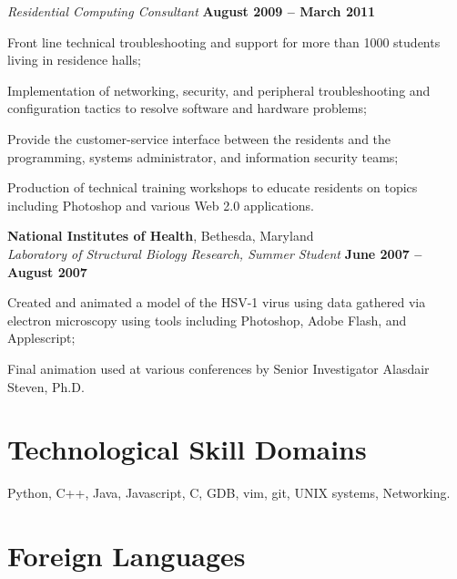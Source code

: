 \documentclass[margin,line]{resume}
\begin{document}
\begin{resume}
\begin{list2}
	\textsl{Residential Computing Consultant} \hfill \textbf{August 2009 -- March 2011}
	\begin{list2}
		\item Front line technical troubleshooting and support for more than 1000 students living in residence halls;
		\item Implementation of networking, security, and peripheral troubleshooting and configuration tactics to resolve software and hardware problems;
		\item Provide the customer-service interface between the residents and the programming, systems administrator, and information security teams;
		\item Production of technical training workshops to educate residents on topics including Photoshop and various Web 2.0 
	applications. 
	\end{list2}\vspace{-1.5mm}

	\textbf{National Institutes of Health}, Bethesda, Maryland \vspace{1mm}\\\vspace{0mm}%
	\textsl{Laboratory of Structural Biology Research, Summer Student} \hfill \textbf{June 2007 -- August 2007}
	\begin{list2}
		\item Created and animated a model of the HSV-1 virus using data gathered via electron microscopy 
	using tools including Photoshop, Adobe Flash, and Applescript;
		\item Final animation used at various conferences by Senior Investigator Alasdair Steven, Ph.D.
	\end{list2}\vspace{-1.5mm}

	\section{\mysidestyle Technological Skill Domains} 

	Python, C++, Java, Javascript, C, GDB, vim, git, UNIX systems, Networking.


	\section{\mysidestyle Foreign Languages}


\end{list2}
\end{resume}
\end{document}
